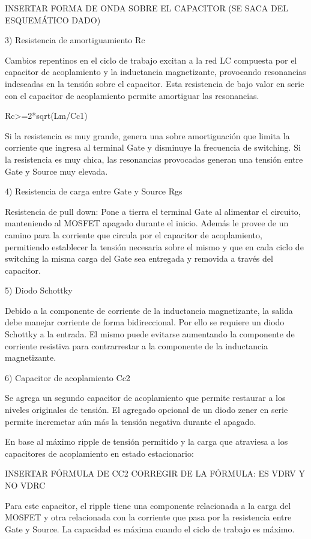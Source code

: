 INSERTAR FORMA DE ONDA SOBRE EL CAPACITOR (SE SACA DEL ESQUEMÁTICO DADO)

3) Resistencia de amortiguamiento Rc

Cambios repentinos en el ciclo de trabajo excitan a la red LC compuesta por el capacitor de acoplamiento 
y la inductancia magnetizante, provocando resonancias indeseadas en la tensión sobre el capacitor. 
Esta resistencia de bajo valor en serie con el capacitor de acoplamiento permite amortiguar las resonancias. 

Rc>=2*sqrt(Lm/Cc1)

Si la resistencia es muy grande, genera una sobre amortiguación que limita la corriente que ingresa al terminal Gate y disminuye la frecuencia de switching. 
Si la resistencia es muy chica, las resonancias provocadas generan una tensión entre Gate y Source muy elevada.

4) Resistencia de carga entre Gate y Source Rgs

Resistencia de pull down: Pone a tierra el terminal Gate al alimentar el circuito, manteniendo al MOSFET apagado durante el inicio. 
Además le provee de un camino para la corriente que circula por el capacitor de acoplamiento, 
permitiendo establecer la tensión necesaria sobre el mismo y que en cada ciclo de switching 
la misma carga del Gate sea entregada y removida a través del capacitor. 

5) Diodo Schottky 

Debido a la componente de corriente de la inductancia magnetizante, la salida debe manejar corriente de forma bidireccional. 
Por ello se requiere un diodo Schottky a la entrada. 
El mismo puede evitarse aumentando la componente de corriente resistiva para contrarrestar a la componente de la inductancia magnetizante. 

6) Capacitor de acoplamiento Cc2  

Se agrega un segundo capacitor de acoplamiento que permite restaurar a los niveles originales de tensión. 
El agregado opcional de un diodo zener en serie permite incremetar aún más la tensión negativa durante el apagado. 

En base al máximo ripple de tensión permitido y la carga que atraviesa a los capacitores de acoplamiento en estado estacionario:

INSERTAR FÓRMULA DE CC2 
CORREGIR DE LA FÓRMULA: ES VDRV Y NO VDRC

Para este capacitor, el ripple tiene una componente relacionada a la carga del MOSFET 
y otra relacionada con la corriente que pasa por la resistencia entre Gate y Source. 
La capacidad es máxima cuando el ciclo de trabajo es máximo. 

